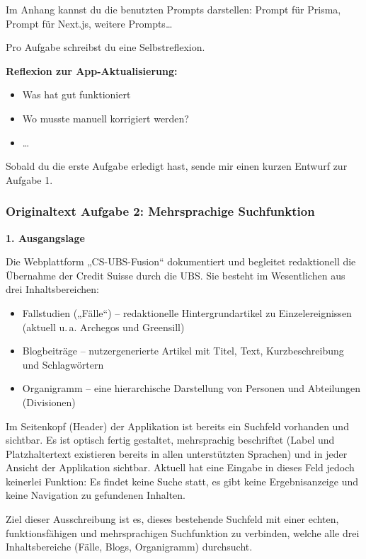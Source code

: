 \documentclass[11pt,a4paper]{article}
\newcommand{\minihead}[1]{\par\needspace{5\baselineskip}\noindent\textbf{#1}\par\nobreak}
\let\oldsubsubsection\subsubsection
\renewcommand{\subsubsection}{\needspace{6\baselineskip}\oldsubsubsection}
\begin{document}
Im Anhang kannst du die benutzten Prompts darstellen: Prompt für Prisma, Prompt für Next.js, weitere Prompts\ldots

Pro Aufgabe schreibst du eine Selbstreflexion.

\minihead{Reflexion zur App-Aktualisierung:}
\begin{itemize}[nosep]
  \item Was hat gut funktioniert
  \item Wo musste manuell korrigiert werden?
  \item \ldots
\end{itemize}

Sobald du die erste Aufgabe erledigt hast, sende mir einen kurzen Entwurf zur Aufgabe 1.

\subsubsection{Originaltext Aufgabe 2: Mehrsprachige Suchfunktion}

\minihead{1. Ausgangslage}

Die Webplattform „CS-UBS-Fusion“ dokumentiert und begleitet redaktionell die Übernahme der Credit Suisse durch die UBS. Sie besteht im Wesentlichen aus drei Inhaltsbereichen:
\begin{itemize}[nosep]
  \item Fallstudien („Fälle“) – redaktionelle Hintergrundartikel zu Einzelereignissen (aktuell u.\,a. Archegos und Greensill)
  \item Blogbeiträge – nutzergenerierte Artikel mit Titel, Text, Kurzbeschreibung und Schlagwörtern
  \item Organigramm – eine hierarchische Darstellung von Personen und Abteilungen (Divisionen)
\end{itemize}

Im Seitenkopf (Header) der Applikation ist bereits ein Suchfeld vorhanden und sichtbar. Es ist optisch fertig gestaltet, mehrsprachig beschriftet (Label und Platzhaltertext existieren bereits in allen unterstützten Sprachen) und in jeder Ansicht der Applikation sichtbar. Aktuell hat eine Eingabe in dieses Feld jedoch keinerlei Funktion: Es findet keine Suche statt, es gibt keine Ergebnisanzeige und keine Navigation zu gefundenen Inhalten.

Ziel dieser Ausschreibung ist es, dieses bestehende Suchfeld mit einer echten, funktionsfähigen und mehrsprachigen Suchfunktion zu verbinden, welche alle drei Inhaltsbereiche (Fälle, Blogs, Organigramm) durchsucht.
\end{document}
